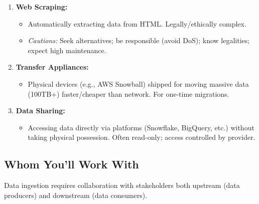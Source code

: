 \begin{enumerate}
    \item \textbf{Web Scraping:}
    \begin{itemize}[label=\textbullet]
        \item Automatically extracting data from HTML. Legally/ethically complex.
        \item \textit{Cautions:} Seek alternatives; be responsible (avoid DoS); know legalities; expect high maintenance.
    \end{itemize}

    \item \textbf{Transfer Appliances:}
    \begin{itemize}[label=\textbullet]
        \item Physical devices (e.g., AWS Snowball) shipped for moving massive data (100TB+) faster/cheaper than network. For one-time migrations.
    \end{itemize}

    \item \textbf{Data Sharing:}
    \begin{itemize}[label=\textbullet]
        \item Accessing data directly via platforms (Snowflake, BigQuery, etc.) without taking physical possession. Often read-only; access controlled by provider.
    \end{itemize}

\end{enumerate}







\subsection{Whom You'll Work With}
Data ingestion requires collaboration with stakeholders both
upstream (data producers) and downstream (data consumers).

